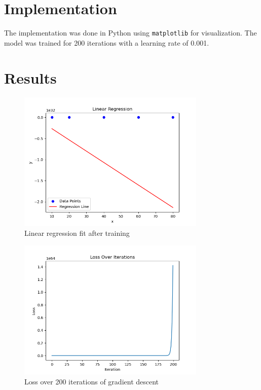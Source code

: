 \documentclass{article}
\begin{document}
\section{Implementation}
The implementation was done in Python using \texttt{matplotlib} for visualization. The model was trained for 200 iterations with a learning rate of 0.001.

\section{Results}
\begin{figure}[H]
    \centering
    \includegraphics[width=0.8\textwidth]{Figure_1.png}
    \caption{Linear regression fit after training}
\end{figure}

\begin{figure}[H]
    \centering
    \includegraphics[width=0.8\textwidth]{Figure_2.png}
    \caption{Loss over 200 iterations of gradient descent}
\end{figure}
\end{document}
